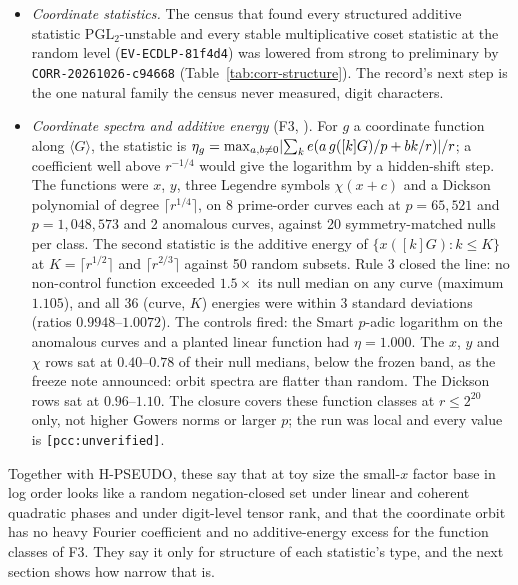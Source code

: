\begin{itemize}
  $x$-labelling and the random relabellings both sit at the rank ceiling
  $2^L$ (1024 at $p=1021$), while the discrete-log labelling, the positive
  control, has rank 109--121. A low score on one anomalous curve at $p=61$
  was followed up on 63 anomalous and 63 ordinary curves at $37\le p\le127$
  ():
  NULL, permutation $p=0.831$, the anomalous curves slightly above the
  ordinary ones.
\item \emph{Coordinate statistics.} The census that found every structured
  additive statistic $\mathrm{PGL}_2$-unstable and every stable multiplicative
  coset statistic at the random level (\texttt{EV-ECDLP-81f4d4}) was lowered
  from strong to preliminary by \texttt{CORR-20261026-c94668}
  (Table~\ref{tab:corr-structure}). The record's next step is the one
  natural family the census never measured, digit characters.
\item \emph{Coordinate spectra and additive energy} (F3,
  ). For $g$ a coordinate
  function along $\langle G\rangle$, the statistic is
  $\eta_g=\max_{a,b\ne0}\lvert \sum_{k}e(a\,g([k]G)/p+bk/r) \rvert/r$; a coefficient
  well above $r^{-1/4}$ would give the logarithm by a hidden-shift step. The
  functions were $x$, $y$, three Legendre symbols $\chi(x+c)$ and a Dickson
  polynomial of degree $\lceil r^{1/4}\rceil$, on 8 prime-order curves each
  at $p=65{,}521$ and $p=1{,}048{,}573$ and 2 anomalous curves, against 20
  symmetry-matched nulls per class. The second statistic is the additive
  energy of $\{x([k]G):k\le K\}$ at $K=\lceil r^{1/2}\rceil$ and
  $\lceil r^{2/3}\rceil$ against 50 random subsets. Rule 3 closed the line: no
  non-control function exceeded $1.5\times$ its null median on any curve
  (maximum $1.105$), and all 36 (curve, $K$) energies were within 3 standard
  deviations (ratios $0.9948$--$1.0072$). The controls fired: the Smart
  $p$-adic logarithm on the anomalous curves and a planted linear function
  had $\eta=1.000$. The $x$, $y$ and $\chi$ rows sat at $0.40$--$0.78$ of
  their null medians, below the frozen band, as the freeze note announced:
  orbit spectra are flatter than random. The Dickson rows sat at
  $0.96$--$1.10$. The closure covers these function classes at $r\le2^{20}$
  only, not higher Gowers norms or larger $p$; the run was local and every
  value is \texttt{[pcc:unverified]}.
\end{itemize}
Together with H-PSEUDO, these say that at toy size the small-$x$ factor base
in log order looks like a random negation-closed set under linear and
coherent quadratic phases and under digit-level tensor rank, and that the
coordinate orbit has no heavy Fourier coefficient and no additive-energy
excess for the function classes of F3. They say it
only for structure of each statistic's type, and the next section shows how
narrow that is.

